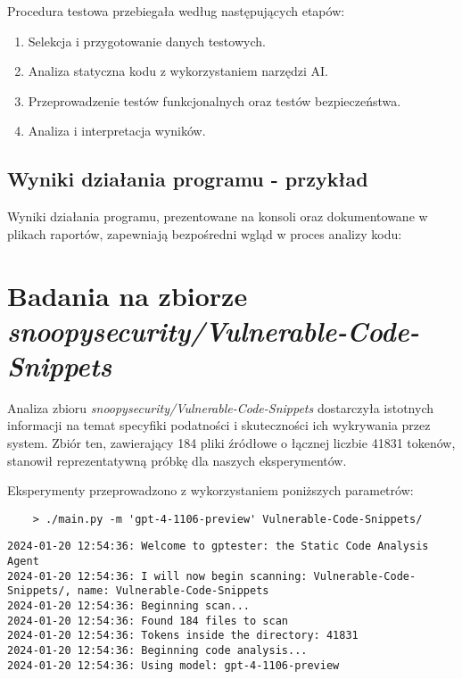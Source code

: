 Procedura testowa przebiegała według następujących etapów:
\begin{enumerate}
    \item Selekcja i przygotowanie danych testowych.
    \item Analiza statyczna kodu z wykorzystaniem narzędzi AI.
    \item Przeprowadzenie testów funkcjonalnych oraz testów bezpieczeństwa.
    \item Analiza i interpretacja wyników.
\end{enumerate}

\subsection{Wyniki działania programu - przykład}
\label{subsec:wyniki_dzialania_programu}

Wyniki działania programu, prezentowane na konsoli oraz dokumentowane w plikach raportów, zapewniają bezpośredni wgląd w proces analizy kodu:





\section{Badania na zbiorze \textit{snoopysecurity/Vulnerable-Code-Snippets}}
\label{sec:badania_na_zbiorze_snoopysecurity}

Analiza zbioru \textit{snoopysecurity/Vulnerable-Code-Snippets} dostarczyła istotnych informacji na temat specyfiki podatności i skuteczności ich wykrywania przez system. Zbiór ten, zawierający 184 pliki źródłowe o łącznej liczbie 41831 tokenów, stanowił reprezentatywną próbkę dla naszych eksperymentów.

Eksperymenty przeprowadzono z wykorzystaniem poniższych parametrów:
\begin{verbatim}
    > ./main.py -m 'gpt-4-1106-preview' Vulnerable-Code-Snippets/
\end{verbatim}


\begin{verbatim}
2024-01-20 12:54:36: Welcome to gptester: the Static Code Analysis Agent
2024-01-20 12:54:36: I will now begin scanning: Vulnerable-Code-Snippets/, name: Vulnerable-Code-Snippets
2024-01-20 12:54:36: Beginning scan...
2024-01-20 12:54:36: Found 184 files to scan
2024-01-20 12:54:36: Tokens inside the directory: 41831
2024-01-20 12:54:36: Beginning code analysis...
2024-01-20 12:54:36: Using model: gpt-4-1106-preview
\end{verbatim}



